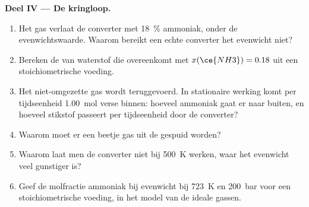 \begin{problem}
\medskip
\noindent\textbf{Deel IV --- De kringloop.}
\begin{enumerate}[resume]
  \item Het gas verlaat de converter met \qty{18}{\percent} ammoniak, onder
        de evenwichtswaarde. Waarom bereikt een echte converter het evenwicht
        niet?
  \item Bereken de  van waterstof die overeenkomt met
        $x(\ce{NH3}) = 0.18$ uit een stoichiometrische voeding.
  \item Het niet-omgezette gas wordt teruggevoerd. In stationaire werking komt per tijdseenheid
        \qty{1.00}{mol} verse  binnen: hoeveel ammoniak gaat er naar buiten, en hoeveel
        stikstof passeert per tijdseenheid door de converter?
  \item Waarom moet er een beetje gas uit de  gespuid worden?
  \item Waarom laat men de converter niet bij \qty{500}{K} werken, waar het evenwicht
        veel gunstiger is?
  \item Geef de molfractie ammoniak bij evenwicht bij \qty{723}{K} en
        \qty{200}{bar} voor een stoichiometrische voeding, in het model van de ideale gassen.
\end{enumerate}
\end{problem}
